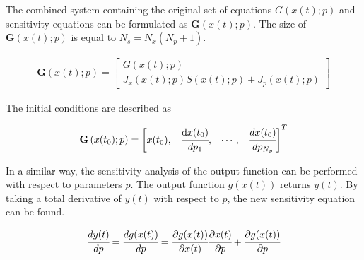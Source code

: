 \documentclass[../Article_Model_Parameters.tex]{subfiles}
\begin{document}
	The combined system containing the original set of equations ${G}({x}(t);{p})$ and sensitivity equations can be formulated as ${\textbf{G}}\left({x}(t);{p}\right)$. The size of ${\textbf{G}}\left({x}(t);{p}\right)$ is equal to $N_s = N_x(N_p + 1)$.
	
	{\footnotesize
		\begin{align}
			{\textbf{G}}\left({x}(t);{p}\right) = 
			\begin{bmatrix}
				{G}({x}(t);{p})\\
				{J_x}({x}(t);{p}){S}({x}(t);{p}) + {J_p}({x}(t);{p})
			\end{bmatrix}
	\end{align} }
	
	The initial conditions are described as
	
	{\footnotesize
		\begin{align}
			{\textbf{G}}\left({x}(t_0);{p}\right)  = 
			\begin{bmatrix} {x}(t_0),			& 
				\cfrac{ \text{d}{x}(t_0) }{ d{p_1} },		& 
				\cdots,					 	&
				\cfrac{ d{x}(t_0) }{ d{p_{N_p}} } 
			\end{bmatrix}^T
	\end{align} }
	
	In a similar way, the sensitivity analysis of the output function can be performed with respect to parameters ${p}$. The output function ${g}({x}(t))$ returns ${y}(t)$. By taking a total derivative of ${y}(t)$ with respect to ${p}$, the new sensitivity equation can be found.
	
	{\footnotesize
		\begin{align}
			\cfrac{d {y}(t)}{d{p}} = \cfrac{d {g}({x}(t))}{d{p}} = \cfrac{\partial {g}({x}(t))}{\partial {x}(t)} \cfrac{\partial {x}(t)}{\partial {p}} + \cfrac{\partial {g}({x}(t))}{\partial {p}}
	\end{align} }
	
\end{document}
